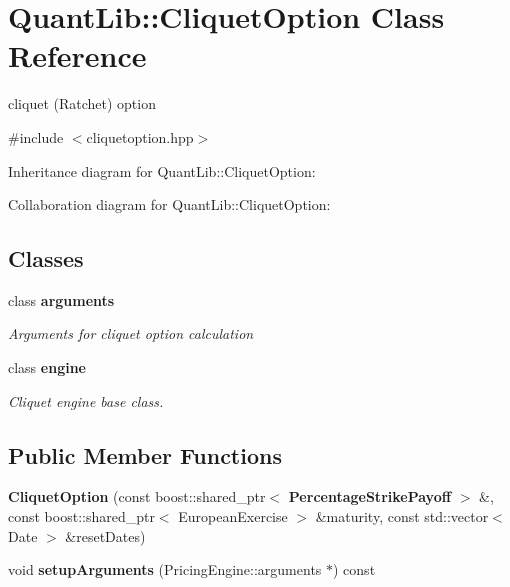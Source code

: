 \section{Quant\+Lib\+:\+:Cliquet\+Option Class Reference}
\label{class_quant_lib_1_1_cliquet_option}


cliquet (Ratchet) option  




{\ttfamily \#include $<$cliquetoption.\+hpp$>$}



Inheritance diagram for Quant\+Lib\+:\+:Cliquet\+Option\+:


Collaboration diagram for Quant\+Lib\+:\+:Cliquet\+Option\+:
\subsection*{Classes}
\begin{DoxyCompactItemize}
\item 
class {\bf arguments}
\begin{DoxyCompactList}\small\item\em Arguments for cliquet option calculation \end{DoxyCompactList}\item 
class {\bf engine}
\begin{DoxyCompactList}\small\item\em Cliquet engine base class. \end{DoxyCompactList}\end{DoxyCompactItemize}
\subsection*{Public Member Functions}
\begin{DoxyCompactItemize}
\item 
{\bfseries Cliquet\+Option} (const boost\+::shared\+\_\+ptr$<$ {\bf Percentage\+Strike\+Payoff} $>$ \&, const boost\+::shared\+\_\+ptr$<$ European\+Exercise $>$ \&maturity, const std\+::vector$<$ Date $>$ \&reset\+Dates)\label{class_quant_lib_1_1_cliquet_option_a568192700fc4b2ddef83a0d4fd0f1976}

\item 
void {\bfseries setup\+Arguments} (Pricing\+Engine\+::arguments $\ast$) const \label{class_quant_lib_1_1_cliquet_option_a4d090efaae06cb00e8f97b3dae2f9e36}

\end{DoxyCompactItemize}
